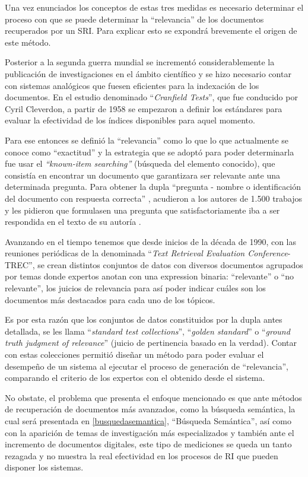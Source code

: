 \documentclass[
  12pt,
  openany]{book}
\begin{document}
Una vez enunciados los conceptos de estas tres medidas es necesario determinar el proceso con que se puede determinar la ``relevancia'' de los documentos recuperados por un SRI. Para explicar esto se expondrá brevemente el origen de este método.

Posterior a la segunda guerra mundial se incrementó considerablemente la publicación de investigaciones en el ámbito científico y se hizo necesario contar con sistemas analógicos que fuesen eficientes para la indexación de los documentos. En el estudio denominado ``\emph{Cranfield Tests}''\citep{harman2011}, que fue conducido por Cyril Cleverdon, a partir de 1958 se empezaron a definir los estándares para evaluar la efectividad de los índices disponibles para aquel momento.

Para ese entonces se definió la ``relevancia'' como lo que lo que actualmente se conoce como ``exactitud'' y la estrategia que se adoptó para poder determinarla fue usar el \emph{``known-item searching''} (búsqueda del elemento conocido), que consistía en encontrar un documento que garantizara ser relevante ante una determinada pregunta. Para obtener la dupla ``pregunta - nombre o identificación del documento con respuesta correcta'' , acudieron a los autores de 1.500 trabajos y les pidieron que formulasen una pregunta que satisfactoriamente iba a ser respondida en el texto de su autoría \citep{harman2011}.

Avanzando en el tiempo tenemos que desde inicios de la década de 1990, con las reuniones periódicas de la denominada ``\emph{Text Retrieval Evaluation Conference}-TREC'', se crean distintos conjuntos de datos con diversos documentos agrupados por temas donde expertos anotan con una expression binaria: ``relevante'' o ``no relevante'', los juicios de relevancia para así poder indicar cuáles son los documentos más destacados para cada uno de los tópicos.

Es por esta razón que los conjuntos de datos constituidos por la dupla antes detallada, se les llama ``\emph{standard test collections}'', ``\emph{golden standard}'' o ``\emph{ground truth judgment of relevance}'' (juicio de pertinencia basado en la verdad). Contar con estas colecciones permitió diseñar un método para poder evaluar el desempeño de un sistema al ejecutar el proceso de generación de ``relevancia'', comparando el criterio de los expertos con el obtenido desde el sistema.

No obstate, el problema que presenta el enfoque mencionado es que ante métodos de recuperación de documentos más avanzados, como la búsqueda semántica, la cual será presentada en \ref{busquedasemantica}, ``Búsqueda Semántica'', así como con la aparición de temas de investigación más especializados y también ante el incremento de documentos digitales, este tipo de mediciones se queda un tanto rezagada y no muestra la real efectividad en los procesos de RI que pueden disponer los sistemas.
\end{document}
